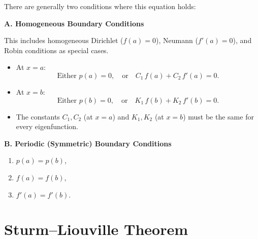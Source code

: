 \documentclass{report}
\begin{document}
There are generally two conditions where this equation holds:

\textbf{A. Homogeneous Boundary Conditions}

This includes homogeneous Dirichlet (\(f(a)=0\)), Neumann (\(f'(a)=0\)), and Robin conditions as special cases.

\begin{itemize}
  \item At \(x = a\): 
    \[
    \text{Either }p(a) = 0,\quad\text{or}\quad C_{1}\,f(a) + C_{2}\,f'(a) = 0.
    \]
  \item At \(x = b\): 
    \[
    \text{Either }p(b) = 0,\quad\text{or}\quad K_{1}\,f(b) + K_{2}\,f'(b) = 0.
    \]
  \item The constants \(C_{1},C_{2}\) (at \(x=a\)) and \(K_{1},K_{2}\) (at \(x=b\)) must be the same for every eigenfunction.
\end{itemize}

\textbf{B. Periodic (Symmetric) Boundary Conditions}

\begin{enumerate}
  \item \(p(a) = p(b)\),
  \item \(f(a) = f(b)\),
  \item \(f'(a) = f'(b)\).
\end{enumerate}

\section{Sturm–Liouville Theorem}
\end{document}
